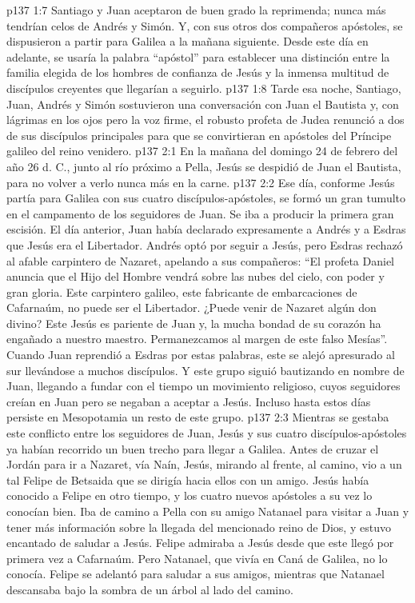 \vs p137 1:7 Santiago y Juan aceptaron de buen grado la reprimenda; nunca más tendrían celos de Andrés y Simón. Y, con sus otros dos compañeros apóstoles, se dispusieron a partir para Galilea a la mañana siguiente. Desde este día en adelante, se usaría la palabra “apóstol” para establecer una distinción entre la familia elegida de los hombres de confianza de Jesús y la inmensa multitud de discípulos creyentes que llegarían a seguirlo.
\vs p137 1:8 \pc Tarde esa noche, Santiago, Juan, Andrés y Simón sostuvieron una conversación con Juan el Bautista y, con lágrimas en los ojos pero la voz firme, el robusto profeta de Judea renunció a dos de sus discípulos principales para que se convirtieran en apóstoles del Príncipe galileo del reino venidero.
\vs p137 2:1 En la mañana del domingo 24 de febrero del año 26 d. C., junto al río próximo a Pella, Jesús se despidió de Juan el Bautista, para no volver a verlo nunca más en la carne.
\vs p137 2:2 Ese día, conforme Jesús partía para Galilea con sus cuatro discípulos\hyp{}apóstoles, se formó un gran tumulto en el campamento de los seguidores de Juan. Se iba a producir la primera gran escisión. El día anterior, Juan había declarado expresamente a Andrés y a Esdras que Jesús era el Libertador. Andrés optó por seguir a Jesús, pero Esdras rechazó al afable carpintero de Nazaret, apelando a sus compañeros: “El profeta Daniel anuncia que el Hijo del Hombre vendrá sobre las nubes del cielo, con poder y gran gloria. Este carpintero galileo, este fabricante de embarcaciones de Cafarnaúm, no puede ser el Libertador. ¿Puede venir de Nazaret algún don divino? Este Jesús es pariente de Juan y, la mucha bondad de su corazón ha engañado a nuestro maestro. Permanezcamos al margen de este falso Mesías”. Cuando Juan reprendió a Esdras por estas palabras, este se alejó apresurado al sur llevándose a muchos discípulos. Y este grupo siguió bautizando en nombre de Juan, llegando a fundar con el tiempo un movimiento religioso, cuyos seguidores creían en Juan pero se negaban a aceptar a Jesús. Incluso hasta estos días persiste en Mesopotamia un resto de este grupo.
\vs p137 2:3 \pc Mientras se gestaba este conflicto entre los seguidores de Juan, Jesús y sus cuatro discípulos\hyp{}apóstoles ya habían recorrido un buen trecho para llegar a Galilea. Antes de cruzar el Jordán para ir a Nazaret, vía Naín, Jesús, mirando al frente, al camino, vio a un tal Felipe de Betsaida que se dirigía hacia ellos con un amigo. Jesús había conocido a Felipe en otro tiempo, y los cuatro nuevos apóstoles a su vez lo conocían bien. Iba de camino a Pella con su amigo Natanael para visitar a Juan y tener más información sobre la llegada del mencionado reino de Dios, y estuvo encantado de saludar a Jesús. Felipe admiraba a Jesús desde que este llegó por primera vez a Cafarnaúm. Pero Natanael, que vivía en Caná de Galilea, no lo conocía. Felipe se adelantó para saludar a sus amigos, mientras que Natanael descansaba bajo la sombra de un árbol al lado del camino.

